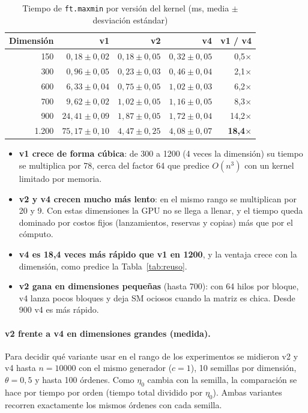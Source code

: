 \documentclass[11pt,a4paper]{article}
\begin{document}
\begin{table}[h]
\centering
\caption{Tiempo de \texttt{ft.maxmin} por versión del kernel (ms, media $\pm$ desviación
estándar)}\label{tab:versiones}
\begin{tabular}{rrrrr}
\toprule
\textbf{Dimensión} & \textbf{v1} & \textbf{v2} & \textbf{v4} & \textbf{v1 / v4}\\
\midrule
150   & $0{,}18 \pm 0{,}02$  & $0{,}18 \pm 0{,}05$ & $0{,}32 \pm 0{,}05$ & 0,5$\times$\\
300   & $0{,}96 \pm 0{,}05$  & $0{,}23 \pm 0{,}03$ & $0{,}46 \pm 0{,}04$ & 2,1$\times$\\
600   & $6{,}33 \pm 0{,}04$  & $0{,}75 \pm 0{,}05$ & $1{,}02 \pm 0{,}03$ & 6,2$\times$\\
700   & $9{,}62 \pm 0{,}02$  & $1{,}02 \pm 0{,}05$ & $1{,}16 \pm 0{,}05$ & 8,3$\times$\\
900   & $24{,}41 \pm 0{,}09$ & $1{,}87 \pm 0{,}05$ & $1{,}72 \pm 0{,}04$ & 14,2$\times$\\
1.200 & $75{,}17 \pm 0{,}10$ & $4{,}47 \pm 0{,}25$ & $4{,}08 \pm 0{,}07$ & \textbf{18,4$\times$}\\
\bottomrule
\end{tabular}
\end{table}

\begin{itemize}
  \item \textbf{v1 crece de forma cúbica}: de 300 a \num{1200} (4 veces la dimensión) su tiempo
        se multiplica por 78, cerca del factor 64 que predice $O(n^3)$ con un kernel limitado por
        memoria.
  \item \textbf{v2 y v4 crecen mucho más lento}: en el mismo rango se multiplican por 20 y 9. Con
        estas dimensiones la GPU no se llega a llenar, y el tiempo queda dominado por costos fijos
        (lanzamientos, reservas y copias) más que por el cómputo.
  \item \textbf{v4 es 18,4 veces más rápido que v1 en \num{1200}}, y la ventaja crece con la
        dimensión, como predice la Tabla~\ref{tab:reuso}.
  \item \textbf{v2 gana en dimensiones pequeñas} (hasta 700): con 64 hilos por bloque, v4 lanza
        pocos bloques y deja SM ociosos cuando la matriz es chica. Desde 900 v4 es más rápido.
\end{itemize}

\paragraph{v2 frente a v4 en dimensiones grandes (medida).}
Para decidir qué variante usar en el rango de los experimentos se midieron v2 y v4 hasta
$n=\num{10000}$ con el mismo generador ($c=1$), 10 semillas por dimensión, $\theta=0{,}5$ y
hasta 100 órdenes. Como $\eta_0$ cambia con la semilla, la comparación se hace por tiempo por
orden (tiempo total dividido por $\eta_0$). Ambas variantes recorren exactamente los mismos
órdenes con cada semilla.
\end{document}
